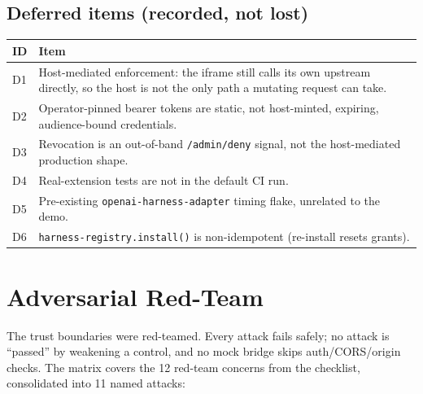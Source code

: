 \documentclass[11pt]{article}
\begin{document}
\subsection{Deferred items (recorded, not lost)}

\begin{center}
\begin{tabular}{@{}p{1.0cm}p{11.2cm}@{}}
\toprule
\textbf{ID} & \textbf{Item} \\
\midrule
D1 & Host-mediated enforcement: the iframe still calls its own upstream directly, so the host is not the only path a mutating request can take. \\
D2 & Operator-pinned bearer tokens are static, not host-minted, expiring, audience-bound credentials. \\
D3 & Revocation is an out-of-band \texttt{/admin/deny} signal, not the host-mediated production shape. \\
D4 & Real-extension tests are not in the default CI run. \\
D5 & Pre-existing \texttt{openai-harness-adapter} timing flake, unrelated to the demo. \\
D6 & \texttt{harness-registry.install()} is non-idempotent (re-install resets grants). \\
\bottomrule
\end{tabular}
\end{center}

\section{Adversarial Red-Team}

The trust boundaries were red-teamed. Every attack fails safely; no attack is
``passed'' by weakening a control, and no mock bridge skips auth/CORS/origin
checks. The matrix covers the 12 red-team concerns from the checklist,
consolidated into 11 named attacks:
\end{document}

